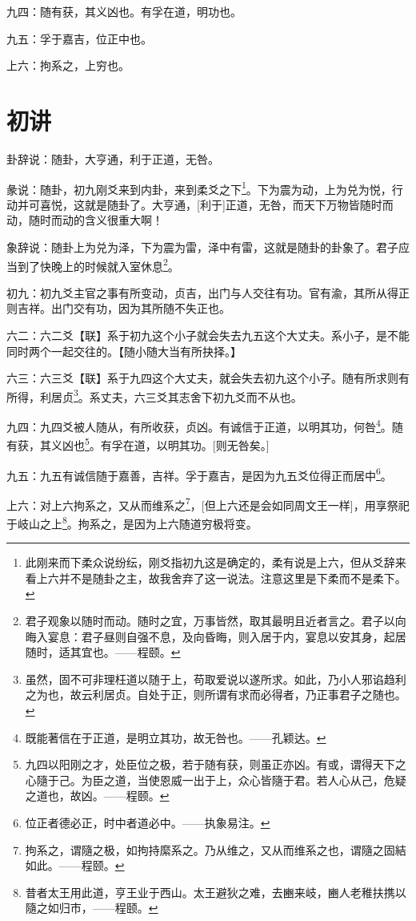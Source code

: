 \documentclass[12pt,oneside]{book}
\begin{document}
九四：随有获，其义凶也。有孚在道，明功也。

九五：孚于嘉吉，位正中也。

上六：拘系之，上穷也。


\section{初讲}
卦辞说：随卦，大亨通，利于正道，无咎。

彖说：随卦，初九刚爻来到内卦，来到柔爻之下\footnote{此刚来而下柔众说纷纭，刚爻指初九这是确定的，柔有说是上六，但从爻辞来看上六并不是随卦之主，故我舍弃了这一说法。注意这里是下柔而不是柔下。}。下为震为动，上为兑为悦，行动并可喜悦，这就是随卦了。大亨通，[利于]正道，无咎，而天下万物皆随时而动，随时而动的含义很重大啊！

象辞说：随卦上为兑为泽，下为震为雷，泽中有雷，这就是随卦的卦象了。君子应当到了快晚上的时候就入室休息\footnote{君子观象以随时而动。随时之宜，万事皆然，取其最明且近者言之。君子以向晦入宴息：君子昼则自强不息，及向昏晦，则入居于内，宴息以安其身，起居随时，适其宜也。——程颐。}。

初九：初九爻主官之事有所变动，贞吉，出门与人交往有功。官有渝，其所从得正则吉祥。出门交有功，因为其所随不失正也。

六二：六二爻【联】系于初九这个小子就会失去九五这个大丈夫。系小子，是不能同时两个一起交往的。【随小随大当有所抉择。】

六三：六三爻【联】系于九四这个大丈夫，就会失去初九这个小子。随有所求则有所得，利居贞\footnote{虽然，固不可非理枉道以随于上，苟取爱说以遂所求。如此，乃小人邪谄趋利之为也，故云利居贞。自处于正，则所谓有求而必得者，乃正事君子之随也。}。系丈夫，六三爻其志舍下初九爻而不从也。

九四：九四爻被人随从，有所收获，贞凶。有诚信于正道，以明其功，何咎\footnote{既能著信在于正道，是明立其功，故无咎也。——孔颖达。}。随有获，其义凶也\footnote{九四以阳刚之才，处臣位之极，若于随有获，则虽正亦凶。有或，谓得天下之心隨于己。为臣之道，当使恩威一出于上，众心皆隨于君。若人心从己，危疑之道也，故凶。——程颐。}。有孚在道，以明其功。[则无咎矣。]

九五：九五有诚信随于嘉善，吉祥。孚于嘉吉，是因为九五爻位得正而居中\footnote{位正者德必正，时中者道必中。——执象易注。}。

上六：对上六拘系之，又从而维系之\footnote{拘系之，谓隨之极，如拘持縻系之。乃从维之，又从而维系之也，谓隨之固結如此。——程颐。}，[但上六还是会如同周文王一样]，用享祭祀于岐山之上\footnote{昔者太王用此道，亨王业于西山。太王避狄之难，去豳来岐，豳人老稚扶携以隨之如归市，——程颐。}。拘系之，是因为上六随道穷极将变。
\end{document}
